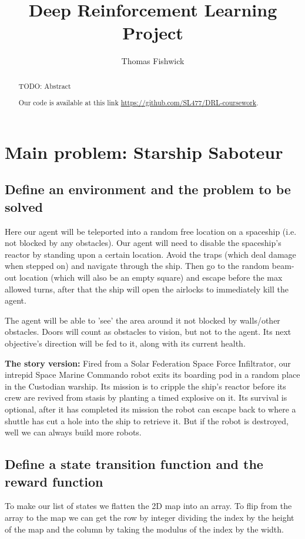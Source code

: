 \documentclass[a4pape, 11pt, english]{article}
\begin{document}
\title{Deep Reinforcement Learning Project}
\author{Thomas Fishwick}
\date{} %
\maketitle

\begin{abstract}
TODO: Abstract

Our code is available at this link \url{https://github.com/SL477/DRL-coursework}.
\end{abstract}

\section{Main problem: Starship Saboteur}
\subsection{Define an environment and the problem to be solved}
Here our agent will be teleported into a random free location on a spaceship (i.e. not blocked by any obstacles). Our agent will need to disable the spaceship's reactor by standing upon a certain location. Avoid the traps (which deal damage when stepped on) and navigate through the ship. Then go to the random beam-out location (which will also be an empty square) and escape before the max allowed turns, after that the ship will open the airlocks to immediately kill the agent.

The agent will be able to 'see' the area around it not blocked by walls/other obstacles. Doors will count as obstacles to vision, but not to the agent. Its next objective's direction will be fed to it, along with its current health.

\textbf{The story version:}
Fired from a Solar Federation Space Force Infiltrator, our intrepid Space Marine Commando robot exits its boarding pod in a random place in the Custodian warship. Its mission is to cripple the ship's reactor before its crew are revived from stasis by planting a timed explosive on it. Its survival is optional, after it has completed its mission the robot can escape back to where a shuttle has cut a hole into the ship to retrieve it. But if the robot is destroyed, well we can always build more robots.

\subsection{Define a state transition function and the reward function}
To make our list of states we flatten the 2D map into an array. To flip from the array to the map we can get the row by integer dividing the index by the height of the map and the column by taking the modulus of the index by the width.
\end{document}
